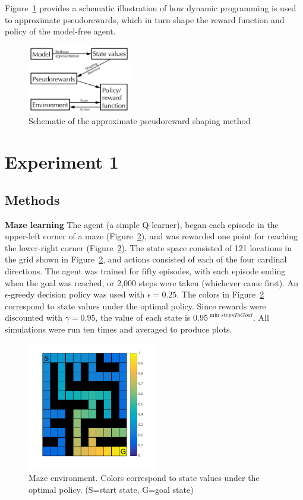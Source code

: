 \documentclass[letterpaper]{article}
\begin{document}
Figure~\ref{fig:approxPR_schematic}  provides a schematic illustration of how dynamic programming is used to approximate pseudorewards, which in turn shape the reward function and policy of the model-free agent.

\begin{figure}[ht]
\centering
\includegraphics[width=0.4\textwidth]{approxPR_schematic}
\caption{Schematic of the approximate pseudoreward shaping method}
\label{fig:approxPR_schematic}
\end{figure}

\section{Experiment 1}

\subsection{Methods}

\textbf{Maze learning} The agent (a simple Q-learner), began each episode in the upper-left corner of a maze (Figure~\ref{fig:maze_values}), and was rewarded one point for reaching the lower-right corner (Figure~\ref{fig:maze_values}). The state space consisted of 121 locations in the grid shown in Figure~\ref{fig:maze_values}, and actions consisted of each of the four cardinal directions. The agent was trained for fifty episodes, with each episode ending when the goal was reached, or 2,000 steps were taken (whichever came first). An $\epsilon$-greedy decision policy was used with $\epsilon = 0.25$. The colors in Figure~\ref{fig:maze_values} correspond to state values under the optimal policy. Since rewards were discounted with $\gamma = 0.95$, the value of each state is $0.95^{\min{stepsToGoal}}$. All simulations were run ten times and averaged to produce plots.

\begin{figure}[ht]
\centering
\includegraphics[width=0.5\textwidth]{maze_values}
\caption{Maze environment. Colors correspond to state values under the optimal policy. (S=start state, G=goal state)}
\label{fig:maze_values}
\end{figure}
\end{document}
